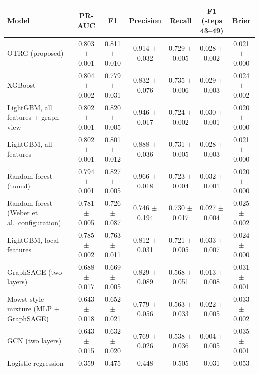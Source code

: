 \begin{tabular}{lcccccc}
\toprule
Model & PR-AUC & F1 & Precision & Recall & F1 (steps 43--49) & Brier \\
\midrule
OTRG (proposed) & 0.803 $\pm$ 0.001 & 0.811 $\pm$ 0.010 & 0.914 $\pm$ 0.032 & 0.729 $\pm$ 0.005 & 0.028 $\pm$ 0.002 & 0.021 $\pm$ 0.000 \\
XGBoost & 0.804 $\pm$ 0.002 & 0.779 $\pm$ 0.031 & 0.832 $\pm$ 0.076 & 0.735 $\pm$ 0.006 & 0.029 $\pm$ 0.003 & 0.024 $\pm$ 0.002 \\
LightGBM, all features + graph view & 0.802 $\pm$ 0.001 & 0.820 $\pm$ 0.005 & 0.946 $\pm$ 0.017 & 0.724 $\pm$ 0.002 & 0.030 $\pm$ 0.001 & 0.020 $\pm$ 0.000 \\
LightGBM, all features & 0.802 $\pm$ 0.001 & 0.801 $\pm$ 0.012 & 0.888 $\pm$ 0.036 & 0.731 $\pm$ 0.005 & 0.028 $\pm$ 0.003 & 0.021 $\pm$ 0.000 \\
Random forest (tuned) & 0.794 $\pm$ 0.001 & 0.827 $\pm$ 0.005 & 0.966 $\pm$ 0.018 & 0.723 $\pm$ 0.004 & 0.032 $\pm$ 0.001 & 0.020 $\pm$ 0.000 \\
Random forest (Weber et al.\ configuration) & 0.781 $\pm$ 0.005 & 0.726 $\pm$ 0.087 & 0.746 $\pm$ 0.194 & 0.730 $\pm$ 0.017 & 0.027 $\pm$ 0.004 & 0.025 $\pm$ 0.002 \\
LightGBM, local features & 0.785 $\pm$ 0.002 & 0.763 $\pm$ 0.011 & 0.812 $\pm$ 0.031 & 0.721 $\pm$ 0.005 & 0.033 $\pm$ 0.007 & 0.024 $\pm$ 0.000 \\
GraphSAGE (two layers) & 0.688 $\pm$ 0.017 & 0.669 $\pm$ 0.005 & 0.829 $\pm$ 0.089 & 0.568 $\pm$ 0.051 & 0.013 $\pm$ 0.008 & 0.031 $\pm$ 0.001 \\
Mowst-style mixture (MLP + GraphSAGE) & 0.643 $\pm$ 0.018 & 0.652 $\pm$ 0.021 & 0.779 $\pm$ 0.056 & 0.563 $\pm$ 0.033 & 0.022 $\pm$ 0.005 & 0.033 $\pm$ 0.002 \\
GCN (two layers) & 0.643 $\pm$ 0.015 & 0.632 $\pm$ 0.020 & 0.769 $\pm$ 0.026 & 0.538 $\pm$ 0.036 & 0.004 $\pm$ 0.005 & 0.035 $\pm$ 0.001 \\
Logistic regression & 0.359 & 0.475 & 0.448 & 0.505 & 0.031 & 0.053 \\
\bottomrule
\end{tabular}
